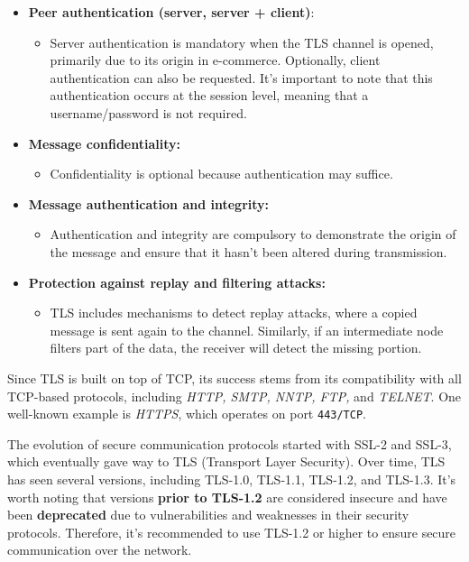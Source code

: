 \begin{itemize}
    \item \textbf{Peer authentication (server, server + client)}:
          \begin{itemize}
              \item Server authentication is mandatory when the TLS channel is opened, primarily due to its origin in e-commerce. Optionally, client authentication can also be requested. It's important to note that this authentication occurs at the session level, meaning that a username/password is not required.
          \end{itemize}

    \item \textbf{Message confidentiality:}
          \begin{itemize}
              \item Confidentiality is optional because authentication may suffice.
          \end{itemize}

    \item \textbf{Message authentication and integrity:}
          \begin{itemize}
              \item Authentication and integrity are compulsory to demonstrate the origin of the message and ensure that it hasn't been altered during transmission.
          \end{itemize}

    \item \textbf{Protection against replay and filtering attacks:}
          \begin{itemize}
              \item TLS includes mechanisms to detect replay attacks, where a copied message is sent again to the channel. Similarly, if an intermediate node filters part of the data, the receiver will detect the missing portion.
          \end{itemize}
\end{itemize}

Since TLS is built on top of TCP, its success stems from its compatibility with all TCP-based protocols, including \textit{HTTP, SMTP, NNTP, FTP,} and \textit{TELNET}. One well-known example is \textit{HTTPS}, which operates on port \texttt{443/TCP}.

The evolution of secure communication protocols started with SSL-2 and SSL-3, which eventually gave way to TLS (Transport Layer Security). Over time, TLS has seen several versions, including TLS-1.0, TLS-1.1, TLS-1.2, and TLS-1.3.
It's worth noting that versions \textbf{prior to TLS-1.2} are considered insecure and have been \textbf{deprecated} due to vulnerabilities and weaknesses in their security protocols. Therefore, it's recommended to use TLS-1.2 or higher to ensure secure communication over the network.


